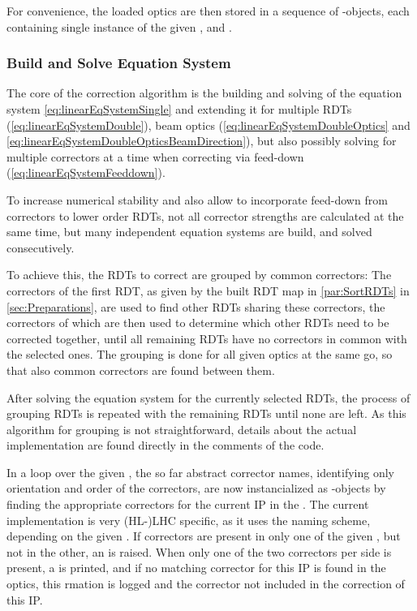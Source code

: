 For convenience, the loaded optics are then stored in a sequence of -objects, 
each containing single instance of the given ,  and . 


\subsubsection{Build and Solve Equation System}
The core of the correction algorithm is the building and solving of the equation system \cref{eq:linearEqSystemSingle}
and extending it for multiple RDTs (\cref{eq:linearEqSystemDouble}), 
beam optics (\cref{eq:linearEqSystemDoubleOptics} and \cref{eq:linearEqSystemDoubleOpticsBeamDirection}), 
but also possibly solving for multiple correctors at a time when correcting via feed-down (\cref{eq:linearEqSystemFeeddown}).

To increase numerical stability and also allow to incorporate feed-down from correctors to lower order RDTs, 
not all corrector strengths are calculated at the same time, but many independent equation systems are build, 
and solved consecutively.

To achieve this, the RDTs to correct are grouped by common correctors: 
The correctors of the first RDT, as given by the built RDT map in \cref{par:SortRDTs} in \cref{sec:Preparations}, 
are used to find other RDTs sharing these correctors, the correctors of which are then used to determine which other RDTs
need to be corrected together, until all remaining RDTs have no correctors in common with the selected ones.
The grouping is done for all given optics at the same go, so that also common correctors are found between them.

After solving the equation system for the currently selected RDTs, the process of grouping RDTs is repeated with the remaining RDTs
until none are left. 
As this algorithm for grouping is not straightforward, details about the actual implementation are found directly in the comments of the code.

\label{par:GetAvailableCorrectors}
In a loop over the given , the so far abstract corrector names, identifying only orientation and order of the correctors, 
are now instancialized as -objects by finding the appropriate correctors for the current IP in the .
The current implementation is very (HL-)LHC specific, as it uses the naming scheme, depending on the given .
If correctors are present in only one of the given , but not in the other, an  is raised.
When only one of the two correctors per side is present, a  is printed, and if no matching corrector for this IP is found
in the optics, this rmation is logged and the corrector not included in the correction of this IP.

